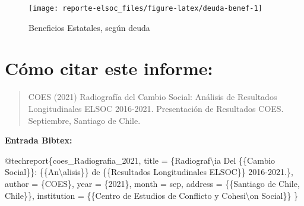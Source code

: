 \documentclass[
  12pt,
  openany]{book}
\newenvironment{Shaded}{\begin{snugshade}}{\end{snugshade}}
\newcommand{\NormalTok}[1]{#1}
\newcommand{\OtherTok}[1]{\textcolor[rgb]{0.56,0.35,0.01}{#1}}
\newcommand{\SpecialCharTok}[1]{\textcolor[rgb]{0.00,0.00,0.00}{#1}}
\newcommand{\StringTok}[1]{\textcolor[rgb]{0.31,0.60,0.02}{#1}}
\begin{document}
\begin{figure}

{\centering \texttt{[image: reporte-elsoc\_files/figure-latex/deuda-benef-1]} 

}

\caption{Beneficios Estatales, según deuda}\label{fig:deuda-benef}
\end{figure}

\hypertarget{cuxf3mo-citar-este-informe}{%
\chapter*{Cómo citar este informe:}\label{cuxf3mo-citar-este-informe}}

\begin{quote}
COES (2021) Radiografía del Cambio Social: Análisis de Resultados Longitudinales ELSOC 2016-2021. Presentación de Resultados COES. Septiembre, Santiago de Chile.
\end{quote}

\textbf{Entrada Bibtex:}

\begin{Shaded}
\begin{Highlighting}[]
\SpecialCharTok{@}\NormalTok{techreport\{coes\_Radiografia\_2021,}
\NormalTok{  title }\OtherTok{=}\NormalTok{ \{Radiograf\textbackslash{}}\StringTok{\textquotesingle{}ia Del \{\{Cambio Social\}\}: \{\{An}\SpecialCharTok{\textbackslash{}\textquotesingle{}}\StringTok{alisis\}\} de \{\{Resultados Longitudinales ELSOC\}\} 2016{-}2021.\},}
\StringTok{  author = \{COES\},}
\StringTok{  year = \{2021\},}
\StringTok{  month = sep,}
\StringTok{  address = \{\{Santiago de Chile, Chile\}\},}
\StringTok{  institution = \{\{Centro de Estudios de Conflicto y Cohesi}\SpecialCharTok{\textbackslash{}\textquotesingle{}}\StringTok{on Social\}\}}
\StringTok{\}}
\end{Highlighting}
\end{Shaded}
\end{document}
